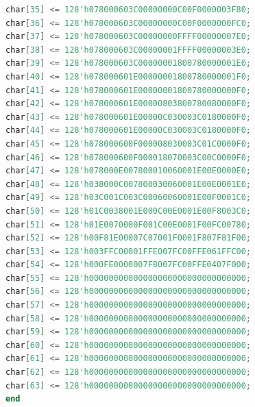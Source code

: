 \documentclass[UTF8]{article}
\theoremstyle{MyLineTheoremStyle} %
\theoremstyle{MyBlockTheoremStyle} %
\theoremstyle{MySubsubsectionStyle} %
\begin{document}
\begin{lstlisting}[language=Verilog, caption={UCAS文字与UCAS-LOGO图像显示Verilog代码修改部分}, label={lst:verilog_code}]
char[35] <= 128'h078000603C00000000C00F0000003F80;
char[36] <= 128'h078000603C00000000C00F0000000FC0;
char[37] <= 128'h078000603C00000000FFFF00000007E0;
char[38] <= 128'h078000603C00000001FFFF00000003E0;
char[39] <= 128'h078000603C00000001800780000001E0;
char[40] <= 128'h078000601E00000001800780000001F0;
char[41] <= 128'h078000601E00000001800780000000F0;
char[42] <= 128'h078000601E00000803800780080000F0;
char[43] <= 128'h078000601E00000C030003C0180000F0;
char[44] <= 128'h078000601E00000C030003C0180000F0;
char[45] <= 128'h078000600F000008030003C01C0000F0;
char[46] <= 128'h078000600F000018070003C00C0000F0;
char[47] <= 128'h078000E007800010060001E00E0000E0;
char[48] <= 128'h038000C007800030060001E00E0001E0;
char[49] <= 128'h03C001C003C00060060001E00F0001C0;
char[50] <= 128'h01C0038001E000C00E0001E00F8003C0;
char[51] <= 128'h01E0070000F001C00E0001F00FC00780;
char[52] <= 128'h00F81E00007C07001F0001F807F81F00;
char[53] <= 128'h003FFC00001FFE007FC00FFE061FFC00;
char[54] <= 128'h000FE0000007F8007FC00FFE0407F000;
char[55] <= 128'h00000000000000000000000000000000;
char[56] <= 128'h00000000000000000000000000000000;
char[57] <= 128'h00000000000000000000000000000000;
char[58] <= 128'h00000000000000000000000000000000;
char[59] <= 128'h00000000000000000000000000000000;
char[60] <= 128'h00000000000000000000000000000000;
char[61] <= 128'h00000000000000000000000000000000;
char[62] <= 128'h00000000000000000000000000000000;
char[63] <= 128'h00000000000000000000000000000000;
end
\end{lstlisting}
\end{document}
